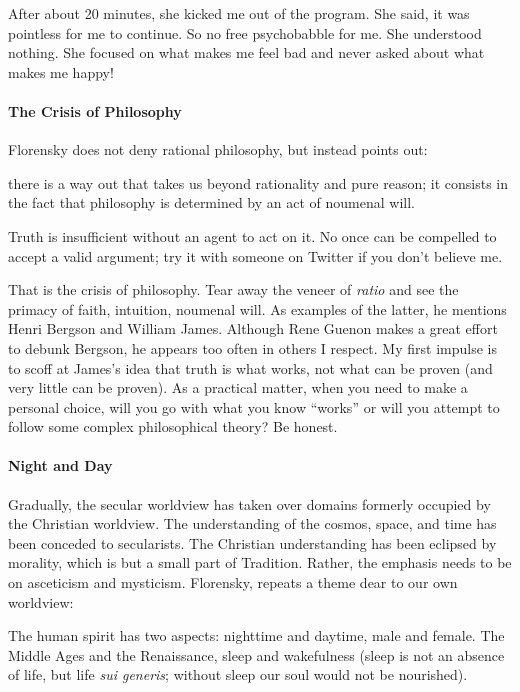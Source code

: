 After about 20 minutes, she kicked me out of the program. She said, it was pointless for me to continue. So no free psychobabble for me. She understood nothing. She focused on what makes me feel bad and never asked about what makes me happy!

\paragraph{The Crisis of Philosophy}


Florensky does not deny rational philosophy, but instead points out:

\begin{quotex}
there is a way out that takes us beyond rationality and pure reason; it consists in the fact that philosophy is determined by an act of noumenal will.
\end{quotex}


Truth is insufficient without an agent to act on it. No once can be compelled to accept a valid argument; try it with someone on Twitter if you don't believe me.

That is the crisis of philosophy. Tear away the veneer of \emph{ratio} and see the primacy of faith, intuition, noumenal will. As examples of the latter, he mentions Henri Bergson and William James. Although Rene Guenon makes a great effort to debunk Bergson, he appears too often in others I respect. My first impulse is to scoff at James's idea that truth is what works, not what can be proven (and very little can be proven). As a practical matter, when you need to make a personal choice, will you go with what you know ``works'' or will you attempt to follow some complex philosophical theory? Be honest.

\paragraph{Night and Day}


Gradually, the secular worldview has taken over domains formerly occupied by the Christian worldview. The understanding of the cosmos, space, and time has been conceded to secularists. The Christian understanding has been eclipsed by morality, which is but a small part of Tradition. Rather, the emphasis needs to be on asceticism and mysticism. Florensky, repeats a theme dear to our own worldview:

\begin{quotex}
The human spirit has two aspects: nighttime and daytime, male and female. The Middle Ages and the Renaissance, sleep and wakefulness (sleep is not an absence of life, but life \emph{sui generis}; without sleep our soul would not be nourished).
\end{quotex}



